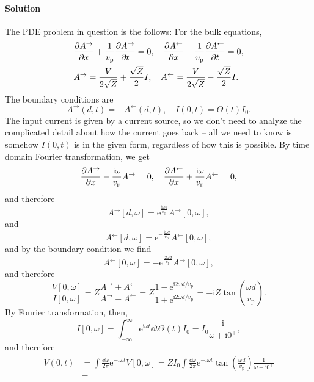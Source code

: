 \documentclass[hyperref, a4paper]{article}
\newcommand*{\ii}{\mathrm{i}}
\newcommand*{\ee}{\mathrm{e}}
\begin{document}
\paragraph{Solution} The PDE problem in question is the follows:
For the bulk equations,
\begin{equation}
    \begin{aligned}
        &\pdv{A^\rightarrow}{x} + \frac{1}{v_{\text{p}}} \pdv{A^\rightarrow}{t} = 0, \quad 
         \pdv{A^\leftarrow}{x}  - \frac{1}{v_{\text{p}}} \pdv{A^\leftarrow}{t} = 0, \\
        &A^{\rightarrow} = \frac{V}{2 \sqrt{Z}} + \frac{\sqrt{Z}}{2} I, \quad 
         A^{\leftarrow } = \frac{V}{2 \sqrt{Z}} - \frac{\sqrt{Z}}{2} I.
    \end{aligned}
\end{equation}
The boundary conditions are 
\begin{equation}
    A^{\rightarrow}(d, t) = - A^{\leftarrow}(d, t), \quad 
    I(0, t) = \Theta(t) I_0.
\end{equation}
The input current is given by a current source,
so we don't need to analyze the complicated detail about how the current goes back -- 
all we need to know is somehow $I(0, t)$ is in the given form, regardless of how this is possible.
By time domain Fourier transformation, we get 
\begin{equation}
    \pdv{A^\rightarrow}{x} - \frac{\ii \omega}{v_{\text{p}}} A^{\rightarrow} = 0, \quad 
    \pdv{A^\leftarrow }{x} + \frac{\ii \omega}{v_{\text{p}}} A^{\leftarrow } = 0,
\end{equation}
and therefore 
\[
    A^{\rightarrow}[d, \omega] = \ee^{\frac{\ii \omega d}{v_{\text{p}}}} A^{\rightarrow}[0, \omega],
\]
and 
\[
    A^{\leftarrow}[d, \omega] = \ee^{- \frac{\ii \omega d}{v_{\text{p}}}} A^{\leftarrow}[0, \omega],
\]
and by the boundary condition we find 
\begin{equation}
    A^{\leftarrow}[0, \omega] = - \ee^{\frac{\ii 2 \omega d}{v_{\text{p}}}} A^{\rightarrow}[0, \omega],
\end{equation}
and therefore 
\begin{equation}
    \frac{V[0, \omega]}{I[0, \omega]} = Z \frac{A^{\rightarrow} + A^{\leftarrow}}{A^{\rightarrow} - A^{\leftarrow}}
    = Z \frac{1 - \ee^{\ii 2 \omega d / v_{\text{p}}}}{1 + \ee^{\ii 2 \omega d / v_{\text{p}}}}
    = - \ii Z \tan(\frac{\omega d}{v_{\text{p}}}).
\end{equation}
By Fourier transformation, then, 
\begin{equation}
    I[0, \omega] = \int^{\infty}_{-\infty} \ee^{\ii \omega t} \dd{t} \Theta(t) I_0 = I_0 \frac{\ii}{\omega + \ii 0^+},
\end{equation}
and therefore 
\begin{equation}
    \begin{aligned}
        V(0, t) &= \int \frac{\dd{\omega}}{2\pi} \ee^{- \ii \omega t} V[0, \omega] = 
        ZI_0 \int \frac{\dd{\omega}}{2\pi} \ee^{- \ii \omega t} 
        \tan\left(\frac{\omega d}{v_{\text{p}}}\right) \frac{1}{\omega + \ii 0^+} \\
        &= 
    \end{aligned}
\end{equation}
\end{document}
